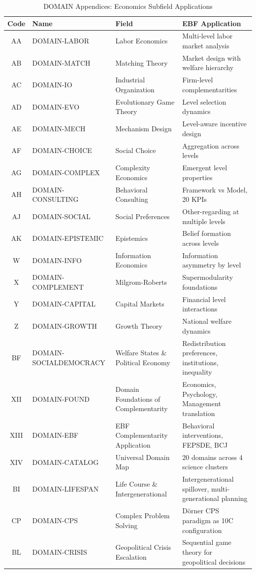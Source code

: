 \begin{table}[htbp]
\centering
\caption{DOMAIN Appendices: Economics Subfield Applications}
\label{tab:index-domain}
\renewcommand{\arraystretch}{1.3}
\small
\begin{tabular}{@{}cllp{5cm}@{}}
\toprule
\textbf{Code} & \textbf{Name} & \textbf{Field} & \textbf{EBF Application} \\
\midrule
AA & DOMAIN-LABOR & Labor Economics & Multi-level labor market analysis \\
AB & DOMAIN-MATCH & Matching Theory & Market design with welfare hierarchy \\
AC & DOMAIN-IO & Industrial Organization & Firm-level complementarities \\
AD & DOMAIN-EVO & Evolutionary Game Theory & Level selection dynamics \\
AE & DOMAIN-MECH & Mechanism Design & Level-aware incentive design \\
AF & DOMAIN-CHOICE & Social Choice & Aggregation across levels \\
AG & DOMAIN-COMPLEX & Complexity Economics & Emergent level properties \\
AH & DOMAIN-CONSULTING & Behavioral Consulting & Framework vs Model, 20 KPIs \\
AJ & DOMAIN-SOCIAL & Social Preferences & Other-regarding at multiple levels \\
AK & DOMAIN-EPISTEMIC & Epistemics & Belief formation across levels \\
W & DOMAIN-INFO & Information Economics & Information asymmetry by level \\
X & DOMAIN-COMPLEMENT & Milgrom-Roberts & Supermodularity foundations \\
Y & DOMAIN-CAPITAL & Capital Markets & Financial level interactions \\
Z & DOMAIN-GROWTH & Growth Theory & National welfare dynamics \\
BF & DOMAIN-SOCIALDEMOCRACY & Welfare States \& Political Economy & Redistribution preferences, institutions, inequality \\
XII & DOMAIN-FOUND & Domain Foundations of Complementarity & Economics, Psychology, Management translation \\
XIII & DOMAIN-EBF & EBF Complementarity Application & Behavioral interventions, FEPSDE, BCJ \\
XIV & DOMAIN-CATALOG & Universal Domain Map & 20 domains across 4 science clusters \\
BI & DOMAIN-LIFESPAN & Life Course \& Intergenerational & Intergenerational spillover, multi-generational planning \\
CP & DOMAIN-CPS & Complex Problem Solving & Dörner CPS paradigm as 10C configuration \\
BL & DOMAIN-CRISIS & Geopolitical Crisis Escalation & Sequential game theory for geopolitical decisions \\
\bottomrule
\end{tabular}
\end{table}

